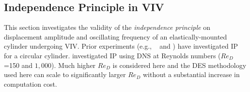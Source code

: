 \subsection{Independence Principle in VIV}
\label{sec:IPinVIV}
%
This section investigates the validity of the {\em independence principle} on
displacement amplitude and oscillating frequency of an elastically-mounted
cylinder undergoing VIV. Prior experiments (e.g., ~\citet{jain2013vortex} and
\citet{franzini2013one}) have investigated IP for a circular cylinder.
\citet{zhao2015validity} investigated IP using DNS at Reynolds numbers
($Re_D$=150 and $1,000$). Much higher $Re_D$ is considered here and the DES
methodology used here can scale to significantly larger $Re_D$ without a
substantial increase in computation cost.

